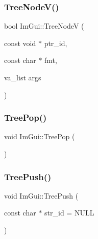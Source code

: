 \mbox{\label{namespace_im_gui_a15320f61ba6b4916af3323bf7844602e}} 
\subsubsection{\texorpdfstring{Tree\+Node\+V()}{TreeNodeV()}\hspace{0.1cm}{\footnotesize\ttfamily [2/2]}}
{\footnotesize\ttfamily bool Im\+Gui\+::\+Tree\+NodeV (\begin{DoxyParamCaption}\item[{const void $\ast$}]{ptr\+\_\+id,  }\item[{const char $\ast$}]{fmt,  }\item[{va\+\_\+list}]{args }\end{DoxyParamCaption})}

\mbox{\label{namespace_im_gui_a41ecf265e5f678c78fc9c30b3cf2077f}} 
\subsubsection{\texorpdfstring{Tree\+Pop()}{TreePop()}}
{\footnotesize\ttfamily void Im\+Gui\+::\+Tree\+Pop (\begin{DoxyParamCaption}{ }\end{DoxyParamCaption})}

\mbox{\label{namespace_im_gui_a596151d99bca5cc0b6393809c1e07af5}} 
\subsubsection{\texorpdfstring{Tree\+Push()}{TreePush()}\hspace{0.1cm}{\footnotesize\ttfamily [1/2]}}
{\footnotesize\ttfamily void Im\+Gui\+::\+Tree\+Push (\begin{DoxyParamCaption}\item[{const char $\ast$}]{str\+\_\+id = {\ttfamily NULL} }\end{DoxyParamCaption})}

\mbox{\label{namespace_im_gui_a71440d86edee2b23abc25cb80e9c9444}} 
